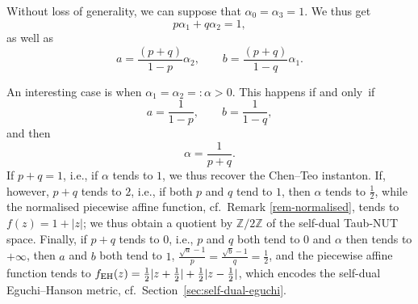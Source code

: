 \documentclass[10pt,a4paper]{amsart}
\numberwithin{equation}{section}
\begin{document}
Without loss of generality, we can suppose that $\alpha _0 = \alpha _3 = 1$. We thus get
\[ p \alpha _1 + q \alpha _2 = 1, \]
as well as
\[%
 a = \frac{(p + q)}{1 - p} \alpha _2, \qquad b = \frac{(p + q)}{1 - q} \alpha _1. \]

 \begin{pc} \label{pc-AF1} An interesting case is when $\alpha _1 = \alpha _2 =: \alpha > 0$. This happens if and only~if
\[ a = \frac{1}{1 - p}, \qquad b = \frac{1}{1 - q}, \]
 and then
 \[ \alpha = \frac{1}{p + q}. \]
 If $p + q = 1$, i.e., if $\alpha$ tends to $1$, we thus recover the Chen--Teo instanton. If, however, $p + q$ tends to $2$, i.e., if both $p$ and $q$ tend to $1$, then $\alpha$ tends to $\frac{1}{2}$, while the normalised piecewise affine function, cf.\ Remark \ref{rem-normalised}, tends to $f (z) = 1 + |z|$; we thus obtain a quotient by $\mathbb{Z}/2 \mathbb{Z}$ of the self-dual Taub-NUT space.
Finally, if $p + q$ tends to $0$, i.e., $p$ and $q$ both tend to $0$ and $\alpha$ then tends to $+ \infty$, then $a$ and $b$ both tend to $1$, $\frac{\sqrt{a} - 1}{p} = \frac{\sqrt{b} - 1}{q} = \frac{1}{2}$, and the piecewise affine function tends to $f_{\rm EH} (z) = \frac{1}{2} |z + \frac{1}{2}| + \frac{1}{2} |z - \frac{1}{2}|$, which encodes the self-dual Eguchi--Hanson metric, cf.~Section~\ref{sec:self-dual-eguchi}.
\end{pc}
\end{document}
